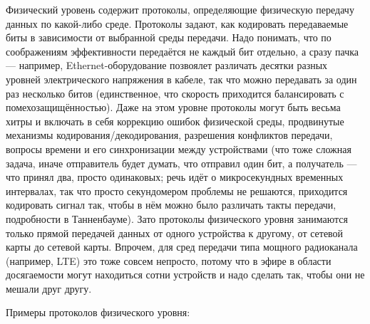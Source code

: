 \documentclass[a5paper]{article}
\begin{document}
Физический уровень содержит протоколы, определяющие физическую передачу данных по какой-либо среде. Протоколы задают, как кодировать передаваемые биты в зависимости от выбранной среды передачи. Надо понимать, что по соображениям эффективности передаётся не каждый бит отдельно, а сразу пачка --- например, Ethernet-оборудование позвоялет различать десятки разных уровней электрического напряжения в кабеле, так что можно передавать за один раз несколько битов (единственное, что скорость приходится балансировать с помехозащищённостью). Даже на этом уровне протоколы могут быть весьма хитры и включать в себя коррекцию ошибок физической среды, продвинутые механизмы кодирования/декодирования, разрешения конфликтов передачи, вопросы времени и его синхронизации между устройствами (что тоже сложная задача, иначе отправитель будет думать, что отправил один бит, а получатель --- что принял два, просто одинаковых; речь идёт о микросекундных временных интервалах, так что просто секундомером проблемы не решаются, приходится кодировать сигнал так, чтобы в нём можно было различать такты передачи, подробности в Танненбауме). Зато протоколы физического уровня занимаются только прямой передачей данных от одного устройства к другому, от сетевой карты до сетевой карты. Впрочем, для сред передачи типа мощного радиоканала (например, LTE) это тоже совсем непросто, потому что в эфире в области досягаемости могут находиться сотни устройств и надо сделать так, чтобы они не мешали друг другу.

Примеры протоколов физического уровня:
\end{document}
